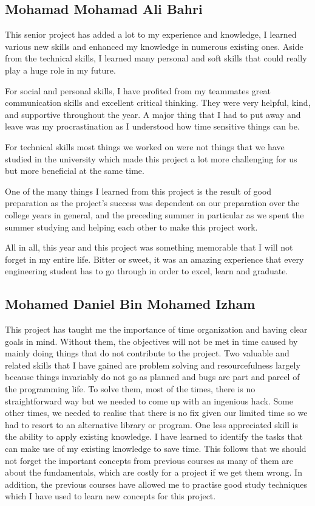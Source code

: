 \documentclass[../main.tex]{subfiles}
\begin{document}
\subsection{Mohamad Mohamad Ali Bahri}
This senior project has added a lot to my experience and knowledge, I learned
various new skills and enhanced my knowledge in numerous existing ones. 
Aside from the technical skills, I learned many personal and soft skills that 
could really play a huge role in my future. 

For social and personal skills, I have profited from my teammates great 
communication skills and excellent critical thinking. They were very helpful, 
kind, and supportive throughout the year. A major thing that I had to put away
and leave was my procrastination as I understood how time sensitive things can
be. 

For technical skills most things we worked on were not things that we have 
studied in the university which made this project a lot more challenging for 
us but more beneficial at the same time. 

One of the many things I learned from this project is the result of good 
preparation as the project's success was dependent on our preparation over the 
college years in general, and the preceding summer in particular as we spent 
the summer studying and helping each other to make this project work.

All in all, this year and this project was something memorable that I will not 
forget in my entire life. Bitter or sweet, it was an amazing experience that 
every engineering student has to go through in order to excel, learn and 
graduate.

\subsection{Mohamed Daniel Bin Mohamed Izham}

This project has taught me the importance of time organization and
having clear goals in mind.
Without them, the objectives will not be met in time caused by mainly
doing things that do not contribute to the project.
Two valuable and related skills that I have gained are problem solving
and resourcefulness largely because things invariably do not go as
planned and bugs are part and parcel of the programming life. 
To solve them, most of the times, there is no straightforward way but
we needed to come up with an ingenious hack.
Some other times, we needed to realise that there is no fix given our
limited time so we had to resort to an alternative library or program.
One less appreciated skill is the ability to apply existing knowledge. 
I have learned to identify the tasks that can make use of my
existing knowledge to save time.
This follows that we should not forget the important concepts from
previous courses as many of them are about the fundamentals, which are
costly for a project if we get them wrong.
In addition, the previous courses have allowed me to practise good
study techniques which I have used to learn new concepts for this
project.
\end{document}
